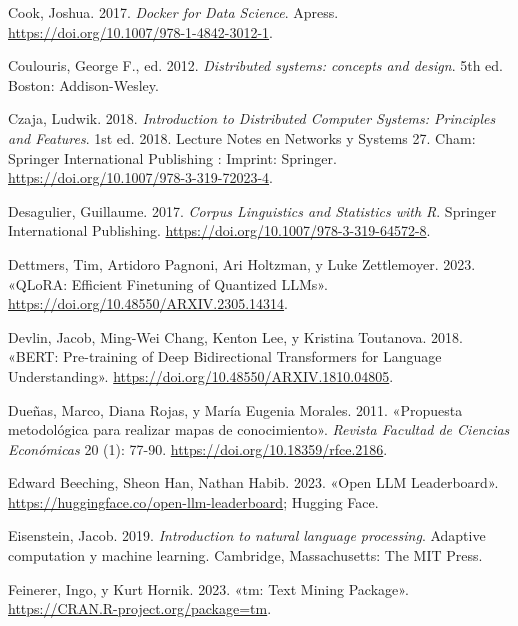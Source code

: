 \documentclass[
  12pt,
  openany]{book}
\newlength{\cslhangindent}
\newlength{\cslentryspacingunit} %
\newenvironment{CSLReferences}[2] %
 {%
  \setlength{\parindent}{0pt}
  \ifodd #1
  \let\oldpar\par
  \def\par{\hangindent=\cslhangindent\oldpar}
  \fi
  \setlength{\parskip}{#2\cslentryspacingunit}
 }%
 {}
\begin{document}
\begin{CSLReferences}{1}{0}
\leavevmode{}%
Cook, Joshua. 2017. \emph{Docker for Data Science}. Apress. \url{https://doi.org/10.1007/978-1-4842-3012-1}.

\leavevmode{}%
Coulouris, George F., ed. 2012. \emph{Distributed systems: concepts and design}. 5th ed. Boston: Addison-Wesley.

\leavevmode{}%
Czaja, Ludwik. 2018. \emph{Introduction to Distributed Computer Systems: Principles and Features}. 1st ed. 2018. Lecture Notes en Networks y Systems 27. Cham: Springer International Publishing : Imprint: Springer. \url{https://doi.org/10.1007/978-3-319-72023-4}.

\leavevmode{}%
Desagulier, Guillaume. 2017. \emph{Corpus Linguistics and Statistics with R}. Springer International Publishing. \url{https://doi.org/10.1007/978-3-319-64572-8}.

\leavevmode{}%
Dettmers, Tim, Artidoro Pagnoni, Ari Holtzman, y Luke Zettlemoyer. 2023. {«QLoRA: Efficient Finetuning of Quantized LLMs»}. \url{https://doi.org/10.48550/ARXIV.2305.14314}.

\leavevmode{}%
Devlin, Jacob, Ming-Wei Chang, Kenton Lee, y Kristina Toutanova. 2018. {«BERT: Pre-training of Deep Bidirectional Transformers for Language Understanding»}. \url{https://doi.org/10.48550/ARXIV.1810.04805}.

\leavevmode{}%
Dueñas, Marco, Diana Rojas, y María Eugenia Morales. 2011. {«Propuesta metodológica para realizar mapas de conocimiento»}. \emph{Revista Facultad de Ciencias Económicas} 20 (1): 77-90. \url{https://doi.org/10.18359/rfce.2186}.

\leavevmode{}%
Edward Beeching, Sheon Han, Nathan Habib. 2023. {«Open LLM Leaderboard»}. \url{https://huggingface.co/open-llm-leaderboard}; Hugging Face.

\leavevmode{}%
Eisenstein, Jacob. 2019. \emph{Introduction to natural language processing}. Adaptive computation y machine learning. Cambridge, Massachusetts: The MIT Press.

\leavevmode{}%
Feinerer, Ingo, y Kurt Hornik. 2023. {«tm: Text Mining Package»}. \url{https://CRAN.R-project.org/package=tm}.


\end{CSLReferences}
\end{document}
